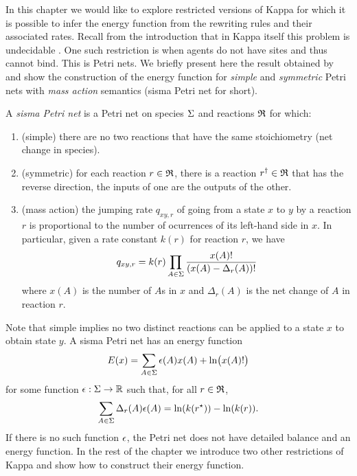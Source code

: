 In this chapter
we would like to explore restricted versions of Kappa
for which it is possible to infer the energy function
from the rewriting rules and their associated rates.
Recall from the introduction
that in Kappa itself this problem is undecidable \citep{et1}.
One such restriction is when agents do not have sites
and thus cannot bind.
This is Petri nets.
We briefly present here the result obtained by \citet{et2}
and show the construction of the energy function
for \emph{simple} and \emph{symmetric} Petri nets
with \emph{mass action} semantics
(sisma Petri net for short).
\begin{definition}
A \emph{sisma Petri net} is a Petri net
on species $\Sigma$ and reactions $\mathfrak{R}$ for which:
\begin{enumerate}[label={(\roman*)}]
\item (simple) there are no two reactions that have
  the same stoichiometry (net change in species).
\item (symmetric) for each reaction $r \in \mathfrak{R}$,
  there is a reaction $r^\dagger \in \mathfrak{R}$
  that has the reverse direction,
  \ie the inputs of one are the outputs of the other.
\item (mass action) the jumping rate $q_{xy,r}$
  of going from a state $x$ to $y$
  by a reaction $r$ is proportional to
  the number of ocurrences of its left-hand side in $x$.
  In particular,
  given a rate constant $k(r)$ for reaction $r$,
  we have
  \[ q_{xy,r} = k(r) \prod_{A \in \Sigma}
     \frac{x(A)!}{(x(A)-\Delta_r(A))!} \]
  where $x(A)$ is the number of $A$s in $x$
  and $\Delta_r(A)$ is the net change of $A$ in reaction $r$.
\end{enumerate}
\end{definition}
Note that simple implies
no two distinct reactions can be applied
to a state $x$ to obtain state $y$.
A sisma Petri net has an energy function
\begin{equation}\label{eq:pn-energy}
  E(x) = \sum_{A \in \Sigma} \epsilon(A) x(A) + \ln\bigl(x(A)!\bigr)
\end{equation}
for some function $\epsilon: \Sigma \to \mathbb{R}$ such that,
for all $r \in \mathfrak{R}$,
\[ \sum_{A \in \Sigma} \Delta_r(A) \epsilon(A) = \ln(k(r^\star)) - \ln(k(r)). \]
If there is no such function $\epsilon$,
the Petri net does not have detailed balance and
an energy function.
%
In the rest of the chapter
we introduce two other restrictions of Kappa
and show how to construct their energy function.


